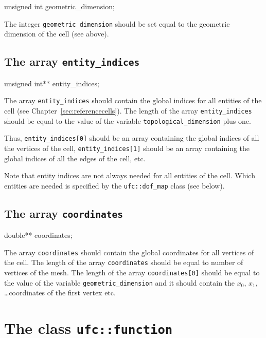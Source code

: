 \begin{code}
unsigned int geometric_dimension;
\end{code}

The integer \texttt{geometric\_dimension} should be set equal to the
geometric dimension of the cell (see above).

\subsection{The array \texttt{entity\_indices}}

\begin{code}
unsigned int** entity_indices;
\end{code}

The array \texttt{entity\_indices} should contain the global indices
for all entities of the cell (see Chapter~\ref{sec:referencecells}).
The length of the array \texttt{entity\_indices} should be equal to
the value of the variable \texttt{topological\_dimension} plus one.

Thus, \texttt{entity\_indices[0]} should be an array containing the
global indices of all the vertices of the cell,
\texttt{entity\_indices[1]} should be an array containing the global
indices of all the edges of the cell, etc. 

Note that entity indices are not always needed for all entities of the
cell. Which entities are needed is specified by the
\texttt{ufc::dof\_map} class (see below).

\subsection{The array \texttt{coordinates}}

\begin{code}
double** coordinates;
\end{code}

The array \texttt{coordinates} should contain the global coordinates
for all vertices of the cell. The length of the array
\texttt{coordinates} should be equal to number of vertices of the
mesh. The length of the array \texttt{coordinates[0]} should be equal
to the value of the variable \texttt{geometric\_dimension} and it
should contain the $x_0$, $x_1$, \ldots coordinates of the first
vertex etc.

\section{The class \texttt{ufc::function}}

